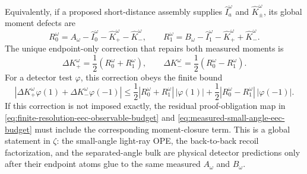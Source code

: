 \begin{controlledapproximation}
Equivalently, if a proposed short-distance assembly supplies
\(\widehat I_a^\omega\) and \(\widehat K_\pm^\omega\), its global moment
defects are
\begin{equation}
  R_0^\omega
  =
  A_\omega-\widehat I_0^\omega-\widehat K_+^\omega-\widehat K_-^\omega,
  \qquad
  R_1^\omega
  =
  B_\omega-\widehat I_1^\omega-\widehat K_+^\omega+\widehat K_-^\omega .
  \label{eq:measured-eec-moment-defects}
\end{equation}
The unique endpoint-only correction that repairs both measured moments is
\begin{equation}
  \Delta K_+^\omega=\frac12(R_0^\omega+R_1^\omega),
  \qquad
  \Delta K_-^\omega=\frac12(R_0^\omega-R_1^\omega).
  \label{eq:measured-eec-moment-closure-correction}
\end{equation}
For a detector test \(\varphi\), this correction obeys the finite bound
\begin{equation}
  \left|
    \Delta K_+^\omega\varphi(1)
    +
    \Delta K_-^\omega\varphi(-1)
  \right|
  \leq
  \frac12|R_0^\omega+R_1^\omega|\,|\varphi(1)|
  +
  \frac12|R_0^\omega-R_1^\omega|\,|\varphi(-1)| .
  \label{eq:measured-eec-moment-closure-test-bound}
\end{equation}
If this correction is not imposed exactly, the residual proof-obligation map in
\eqref{eq:finite-resolution-eec-observable-budget} and
\eqref{eq:measured-small-angle-eec-budget} must include the corresponding
moment-closure term.  This is a global statement in \(\zeta\): the small-angle
light-ray OPE, the back-to-back recoil factorization, and the separated-angle
bulk are physical detector predictions only after their endpoint atoms glue to
the same measured \(A_\omega\) and \(B_\omega\).
\end{controlledapproximation}

